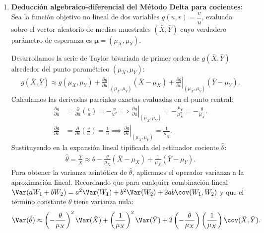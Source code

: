 \begin{solproblema}
	\begin{enumerate}
		\item \textbf{Deducción algebraico-diferencial del Método Delta para cocientes:}
		Sea la función objetivo no lineal de dos variables $g(u, v) = \dfrac{v}{u}$, evaluada sobre el vector aleatorio de medias muestrales $(\bar{X}, \bar{Y})$ cuyo verdadero parámetro de esperanza es $\boldsymbol{\mu} = (\mu_X, \mu_Y)$.
		
		Desarrollamos la serie de Taylor bivariada de primer orden de $g(\bar{X}, \bar{Y})$ alrededor del punto paramétrico $(\mu_X, \mu_Y)$:
		\begin{align}
			g(\bar{X}, \bar{Y}) \approx g(\mu_X, \mu_Y) + \left. \frac{\partial g}{\partial u} \right|_{(\mu_X, \mu_Y)} (\bar{X} - \mu_X) + \left. \frac{\partial g}{\partial v} \right|_{(\mu_X, \mu_Y)} (\bar{Y} - \mu_Y).
		\end{align}
		Calculamos las derivadas parciales exactas evaluadas en el punto central:
		\begin{align}
			\frac{\partial g}{\partial u} &= \frac{\partial}{\partial u}\left( \frac{v}{u} \right) = -\frac{v}{u^2} \implies \left. \frac{\partial g}{\partial u} \right|_{(\mu_X, \mu_Y)} = -\frac{\mu_Y}{\mu_X^2} = -\frac{\theta}{\mu_X}. \\
			\frac{\partial g}{\partial v} &= \frac{\partial}{\partial v}\left( \frac{v}{u} \right) = \frac{1}{u} \implies \left. \frac{\partial g}{\partial v} \right|_{(\mu_X, \mu_Y)} = \frac{1}{\mu_X}.
		\end{align}
		Sustituyendo en la expansión lineal tipificada del estimador cociente $\hat{\theta}$:
		\begin{align}
			\hat{\theta} = \frac{\bar{Y}}{\bar{X}} \approx \theta - \frac{\theta}{\mu_X}(\bar{X} - \mu_X) + \frac{1}{\mu_X}(\bar{Y} - \mu_Y).
		\end{align}
		Para obtener la varianza asintótica de $\hat{\theta}$, aplicamos el operador varianza a la aproximación lineal. Recordando que para cualquier combinación lineal $\Var(aW_1 + bW_2) = a^2\Var(W_1) + b^2\Var(W_2) + 2ab\cov(W_1, W_2)$ y que el término constante $\theta$ tiene varianza nula:
		\begin{align}
			\Var(\hat{\theta}) \approx \left( -\frac{\theta}{\mu_X} \right)^2 \Var(\bar{X}) + \left( \frac{1}{\mu_X} \right)^2 \Var(\bar{Y}) + 2\left( -\frac{\theta}{\mu_X} \right)\left( \frac{1}{\mu_X} \right) \cov(\bar{X}, \bar{Y}).
		\end{align}

\end{enumerate}
\end{solproblema}
